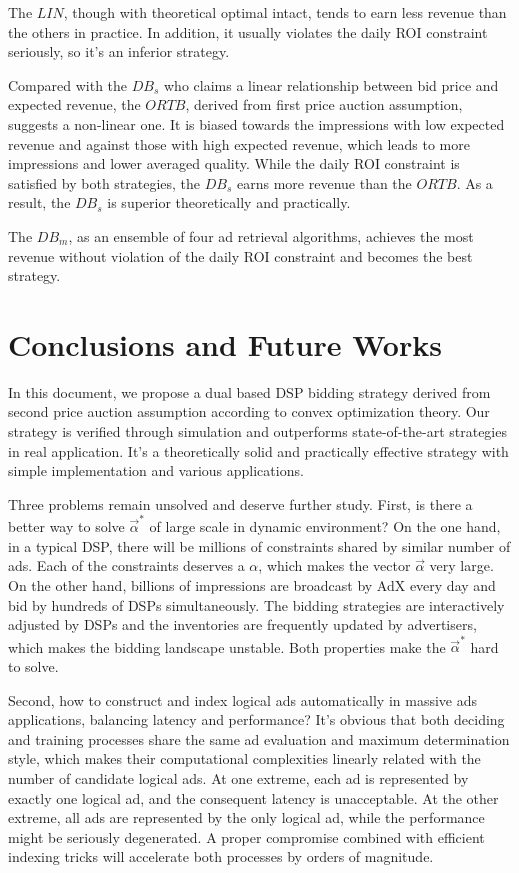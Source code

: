\documentclass{article}
\newcommand{\valpha}{\vec{\alpha}}
\begin{document}
The $LIN$, though with theoretical optimal intact, tends to earn less revenue than the others in practice.
In addition, it usually violates the daily ROI constraint seriously, so it's an inferior strategy.

Compared with the $DB_s$ who claims a linear relationship between bid price and expected revenue,
    the $ORTB$, derived from first price auction assumption, suggests a non-linear one.
It is biased towards the impressions with low expected revenue and against those with high expected revenue,
    which leads to more impressions and lower averaged quality.
While the daily ROI constraint is satisfied by both strategies,
    the $DB_s$ earns more revenue than the $ORTB$. As a result, the $DB_s$ is superior theoretically and practically.

The $DB_m$, as an ensemble of four ad retrieval algorithms,
    achieves the most revenue without violation of the daily ROI constraint and becomes the best strategy.

\section{Conclusions and Future Works}

In this document, we propose a dual based DSP bidding strategy
    derived from second price auction assumption according to convex optimization theory.
Our strategy is verified through simulation and outperforms state-of-the-art strategies in real application.
It's a theoretically solid and practically effective strategy with simple implementation and various applications.

Three problems remain unsolved and deserve further study.
First, is there a better way to solve $\valpha^*$ of large scale in dynamic environment?
On the one hand, in a typical DSP, there will be millions of constraints shared by similar number of ads.
Each of the constraints deserves a $\alpha$, which makes the vector $\valpha$ very large.
On the other hand, billions of impressions are broadcast by AdX every day and bid by hundreds of DSPs simultaneously.
The bidding strategies are interactively adjusted by DSPs and the inventories are frequently updated by advertisers,
    which makes the bidding landscape unstable.
Both properties make the $\valpha^*$ hard to solve.

Second, how to construct and index logical ads automatically in massive ads applications, balancing latency and performance?
It's obvious that both deciding and training processes share the same ad evaluation and maximum determination style,
    which makes their computational complexities linearly related with the number of candidate logical ads.
At one extreme, each ad is represented by exactly one logical ad, and the consequent latency is unacceptable.
At the other extreme, all ads are represented by the only logical ad, while the performance might be seriously degenerated.
A proper compromise combined with efficient indexing tricks will accelerate both processes by orders of magnitude.
\end{document}
